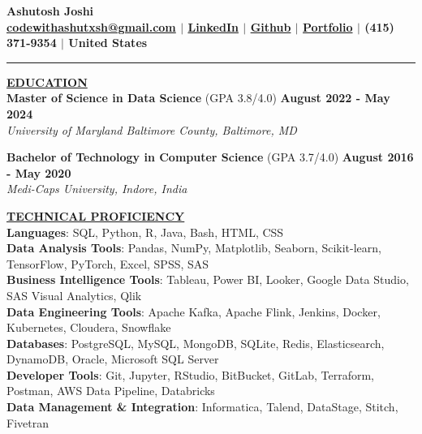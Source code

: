 \documentclass{article}
\begin{document}
\begin{center}
\thispagestyle{empty}
\large \textbf{Ashutosh Joshi \\}
\normalsize \textbf{\href{mailto:codewithashutxsh@gmail.com}{codewithashutxsh@gmail.com} $\mid$ \href{https://www.linkedin.com/in/ashutosh--joshi/}{LinkedIn} $\mid$ \href{https://github.com/ashutoshjoshi1}{Github} $\mid$ \href{https://ashutoshjoshi1.github.io/Portfolio/}{Portfolio} $\mid$ (415) 371-9354 $\mid$ United States \\}
\rule{\textwidth}{1pt}
\end{center}

\noindent \textbf{\underline{EDUCATION}} \\
\textbf{Master of Science in Data Science} (GPA 3.8/4.0)  \hfill \textbf{August 2022 - May 2024} \\
\textit{University of Maryland Baltimore County, Baltimore, MD}
\begin{itemize}[noitemsep,nolistsep,leftmargin=*]
\end{itemize}
\vspace{2mm} 
\textbf{Bachelor of Technology in Computer Science} (GPA 3.7/4.0) \hfill \textbf{August 2016 - May 2020} \\
\textit{Medi-Caps University, Indore, India} 
\vspace{2mm} 

\noindent \textbf{\underline{TECHNICAL PROFICIENCY}} \\
\textbf{Languages}{: \small SQL, Python, R, Java, Bash, HTML, CSS} \\
\textbf{Data Analysis Tools}{: \small Pandas, NumPy, Matplotlib, Seaborn, Scikit-learn, TensorFlow, PyTorch, Excel, SPSS, SAS} \\
\textbf{Business Intelligence Tools}{: \small Tableau, Power BI, Looker, Google Data Studio, SAS Visual Analytics, Qlik} \\
\textbf{Data Engineering Tools}{: \small Apache Kafka, Apache Flink, Jenkins, Docker, Kubernetes, Cloudera, Snowflake} \\
\textbf{Databases}{: \small PostgreSQL, MySQL, MongoDB, SQLite, Redis, Elasticsearch, DynamoDB, Oracle, Microsoft SQL Server} \\
\textbf{Developer Tools}{: \small Git, Jupyter, RStudio, BitBucket, GitLab, Terraform, Postman, AWS Data Pipeline, Databricks} \\
\textbf{Data Management \& Integration}{: \small Informatica, Talend, DataStage, Stitch, Fivetran}
\end{document}
